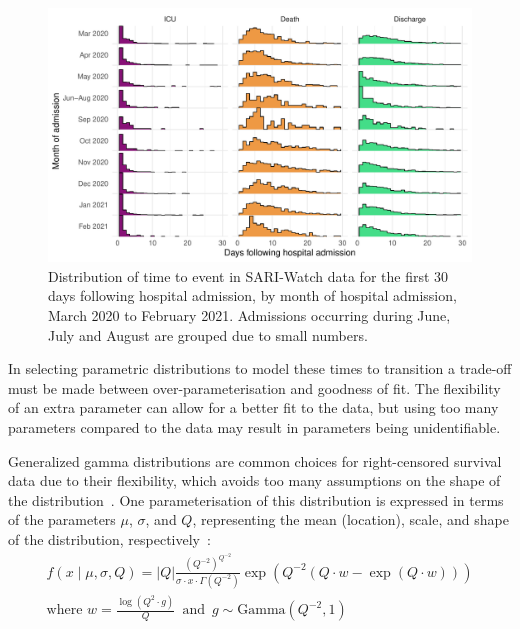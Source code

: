 \begin{figure}[htbp!]
    \centering
    \includegraphics[width=\textwidth]{sari_time_distribution.pdf}
    \caption[Distribution of time to event in SARI-Watch data for the first 30 days following hospital admission, March 2020 to February 2021]{Distribution of time to event in SARI-Watch data for the first 30 days following hospital admission, by month of hospital admission, March 2020 to February 2021. Admissions occurring during June, July and August are grouped due to small numbers.}\label{fig:time-distribution}
\end{figure}

In selecting parametric distributions to model these times to transition a trade-off must be made between over-parameterisation and goodness of fit. The flexibility of an extra parameter can allow for a better fit to the data, but using too many parameters compared to the data may result in parameters being unidentifiable.

Generalized gamma distributions are common choices for right-censored survival data due to their flexibility, which avoids too many assumptions on the shape of the distribution~\parencite{Pal2020-ns}. One parameterisation of this distribution is expressed in terms of the parameters $\mu$, $\sigma$, and $Q$, representing the mean (location), scale, and shape of the distribution, respectively~\parencite{Prentice1974-ec}:
%
\begin{align*}
    f(x \mid \mu, \sigma, Q) = |Q| \frac{{(Q^{-2})}^{Q^{-2}}}{\sigma \cdot x \cdot \Gamma(Q^{-2})} \exp(Q^{-2}(Q\cdot w - \exp(Q\cdot w))) \\
    \text{where } w = \frac{\log(Q^2\cdot g)}{Q}\enspace\text{and}\enspace g \sim \text{Gamma}(Q^{-2}, 1)
\end{align*}

